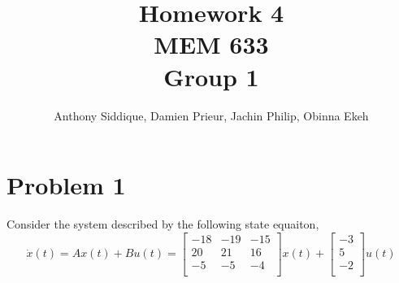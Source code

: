 \documentclass{article}
\author{Anthony Siddique, Damien Prieur, Jachin Philip, Obinna Ekeh}
\title{Homework 4\\ MEM 633 \\ Group 1}
\date{}
\begin{document}
\maketitle

\section*{Problem 1}
Consider the system described by the following state equaiton,
$$
\dot{x}(t) = Ax(t) + Bu(t) =
\begin{bmatrix}
-18 & -19 & -15 \\
20 & 21 & 16 \\
-5 & -5 & -4 \\
\end{bmatrix}
x(t)
+
\begin{bmatrix}
-3 \\
 5 \\ 
-2 \\
\end{bmatrix}
u(t)
$$
\end{document}
